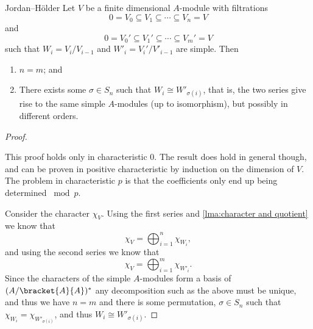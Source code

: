 \documentclass[fleqn]{NotesClass}
\newcommand{\isomorphic}{\cong}
\begin{document}
    \begin{thm}{Jordan--H\"older}{}
        Let \(V\) be a finite dimensional \(A\)-module with filtrations
        \begin{equation}
            0 = V_0 \subseteq V_1 \subseteq \dotsb \subseteq V_n = V
        \end{equation}
        and
        \begin{equation}
            0 = V_0' \subseteq V_1' \subseteq \dotsb \subseteq V_m' = V
        \end{equation}
        such that \(W_i = V_i/V_{i-1}\) and \(W'_{i} = V_i'/V'_{i-1}\) are simple.
        Then
        \begin{enumerate}
            \item \(n = m\); and
            \item There exists some \(\sigma \in S_n\) such that \(W_i \isomorphic W'_{\sigma(i)}\), that is, the two series give rise to the same simple \(A\)-modules (up to isomorphism), but possibly in different orders.
        \end{enumerate}
        \begin{proof}
            ~
            \begin{wrn}
                This proof holds only in characteristic 0.
                The result does hold in general though, and can be proven in positive characteristic by induction on the dimension of \(V\).
                The problem in characteristic \(p\) is that the coefficients only end up being determined \(\bmod p\).
            \end{wrn}
            
            Consider the character \(\chi_V\).
            Using the first series and \cref{lma:character and quotient} we know that
            \begin{equation}
                \chi_V = \bigoplus_{i=1}^n \chi_{W_i},
            \end{equation}
            and using the second series we know that
            \begin{equation}
                \chi_V = \bigoplus_{i=1}^m \chi_{W'_i}.
            \end{equation}
            Since the characters of the simple \(A\)-modules form a basis of \((A/\bracket{A}{A})^*\) any decomposition such as the above must be unique, and thus we have \(n = m\) and there is some permutation, \(\sigma \in S_n\) such that \(\chi_{W_i} = \chi_{W'_{\sigma(i)}}\), and thus \(W_i \isomorphic W'_{\sigma(i)}\).
        \end{proof}
    \end{thm}
    
\end{document}
